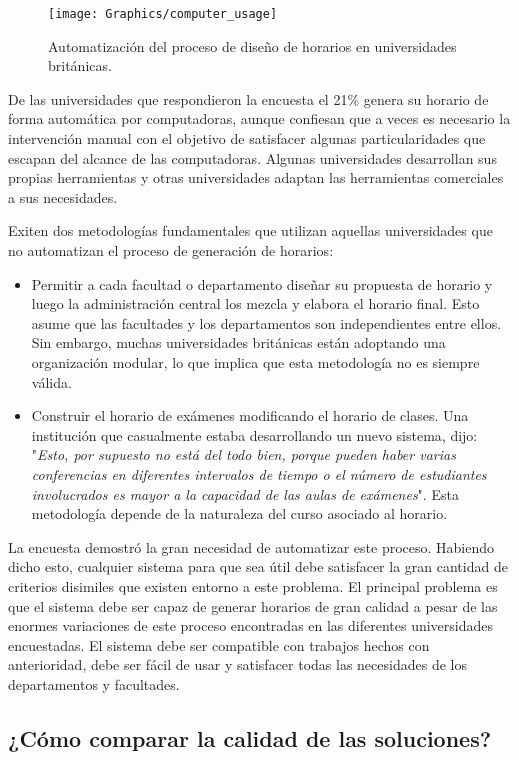 \begin{figure}
	\texttt{[image: Graphics/computer\_usage]}
	\caption{Automatización del proceso de diseño de horarios en universidades británicas.}
\end{figure}

De las universidades que respondieron la encuesta el 21\% genera su horario de forma automática por
computadoras, aunque confiesan que a veces es necesario la intervención manual con el objetivo de satisfacer
algunas particularidades que escapan del alcance de las computadoras. Algunas universidades desarrollan
sus propias herramientas y otras universidades adaptan las herramientas comerciales a sus necesidades.

Exiten dos metodologías fundamentales que utilizan aquellas universidades que no automatizan el proceso de
generación de horarios:

\begin{itemize}
	\item Permitir a cada facultad o departamento diseñar su propuesta de horario y luego la administración
		central los mezcla y elabora el horario final. Esto asume que las facultades y los departamentos
		son independientes entre ellos. Sin embargo, muchas universidades británicas están adoptando una
		organización modular, lo que implica que esta metodología no es siempre válida.
	\item Construir el horario de exámenes modificando el horario de clases. Una institución que casualmente
		estaba desarrollando un nuevo sistema, dijo: "\emph{Esto, por supuesto no está del todo bien, porque
		pueden haber varias conferencias en diferentes intervalos de tiempo o el número de estudiantes involucrados
		es mayor a la capacidad de las aulas de exámenes}". Esta metodología depende de la naturaleza del curso
		asociado al horario.
\end{itemize}

La encuesta demostró la gran necesidad de automatizar este proceso. Habiendo dicho esto, cualquier sistema
para que sea útil debe satisfacer la gran cantidad de criterios disimiles que existen entorno a este problema.
El principal problema es que el sistema debe ser capaz de generar horarios de gran calidad a pesar de las enormes
variaciones de este proceso encontradas en las diferentes universidades encuestadas. El sistema debe ser compatible
con trabajos hechos con anterioridad, debe ser fácil de usar y satisfacer todas las necesidades de los departamentos y facultades.

\subsection{¿Cómo comparar la calidad de las soluciones?}

